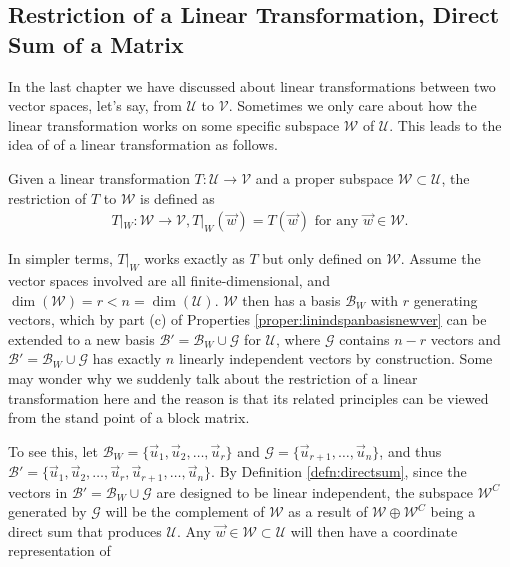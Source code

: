 \subsection{Restriction of a Linear Transformation, Direct Sum of a Matrix}
In the last chapter we have discussed about linear transformations between two vector spaces, let's say, from $\mathcal{U}$ to $\mathcal{V}$. Sometimes we only care about how the linear transformation works on some specific subspace $\mathcal{W}$ of $\mathcal{U}$. This leads to the idea of  of a linear transformation as follows.
\begin{defn}
Given a linear transformation $T: \mathcal{U} \to \mathcal{V}$ and a proper subspace $\mathcal{W} \subset \mathcal{U}$, the restriction of $T$ to $\mathcal{W}$ is defined as
\begin{align*}
T|_W: \mathcal{W} \to \mathcal{V}, T|_W(\vec{w}) = T(\vec{w}) \text{ for any $\vec{w} \in \mathcal{W}$.}
\end{align*}
\end{defn}
In simpler terms, $T|_W$ works exactly as $T$ but only defined on $\mathcal{W}$. Assume the vector spaces involved are all finite-dimensional, and $\dim(\mathcal{W}) = r < n = \dim(\mathcal{U})$. $\mathcal{W}$ then has a basis $\mathcal{B}_W$ with $r$ generating vectors, which by part (c) of Properties \ref{proper:linindspanbasisnewver} can be extended to a new basis $\mathcal{B}' = \mathcal{B}_W \cup \mathcal{G}$ for $\mathcal{U}$, where $\mathcal{G}$ contains $n - r$  vectors and $\mathcal{B}' = \mathcal{B}_W \cup \mathcal{G}$ has exactly $n$ linearly independent vectors by construction. Some may wonder why we suddenly talk about the restriction of a linear transformation here and the reason is that its related principles can be viewed from the stand point of a block matrix.\par
To see this, let $\mathcal{B}_W = \{\vec{u}_1, \vec{u}_2, \ldots, \vec{u}_r\}$ and $\mathcal{G} = \{\vec{u}_{r+1}, \ldots, \vec{u}_n\}$, and thus $\mathcal{B}' = \{\vec{u}_1, \vec{u}_2, \ldots, \vec{u}_r, \vec{u}_{r+1}, \ldots, \vec{u}_n\}$. By Definition \ref{defn:directsum}, since the vectors in $\mathcal{B}' = \mathcal{B}_W \cup \mathcal{G}$ are designed to be linear independent, the subspace $\mathcal{W}^C$ generated by $\mathcal{G}$ will be the complement of $\mathcal{W}$ as a result of $\mathcal{W} \oplus \mathcal{W}^C$ being a direct sum that produces $\mathcal{U}$. Any $\vec{w} \in \mathcal{W} \subset \mathcal{U}$ will then have a coordinate representation of
